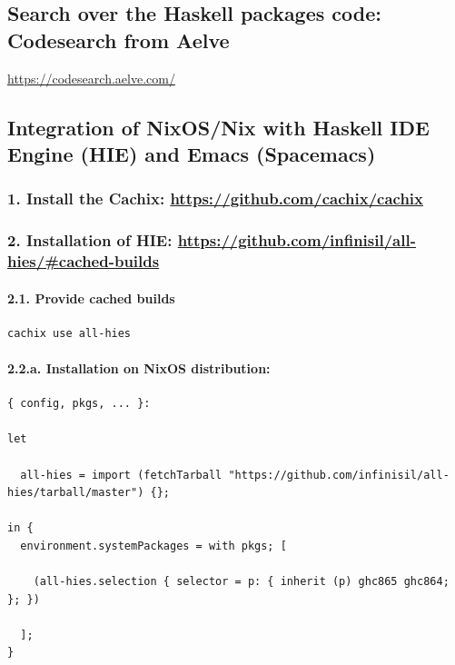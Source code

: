 \documentclass[11pt]{article}
\begin{document}
\subsection{Search over the Haskell packages code: Codesearch from Aelve}
\label{sec:org66c3194}
\url{https://codesearch.aelve.com/}\\

\subsection{Integration of NixOS/Nix with Haskell IDE Engine (HIE) and Emacs (Spacemacs)}
\label{sec:orgff3d598}
\subsubsection{1. Install the Cachix: \url{https://github.com/cachix/cachix}}
\label{sec:org0e44059}

\subsubsection{2. Installation of HIE: \url{https://github.com/infinisil/all-hies/\#cached-builds}}
\label{sec:org23c41cc}

\paragraph{2.1. Provide cached builds}
\label{sec:org0d01d0a}

\begin{verbatim}
cachix use all-hies
\end{verbatim}

\paragraph{2.2.a. Installation on NixOS distribution:}
\label{sec:org0ff16ac}

\begin{verbatim}
{ config, pkgs, ... }:

let

  all-hies = import (fetchTarball "https://github.com/infinisil/all-hies/tarball/master") {};

in {
  environment.systemPackages = with pkgs; [

    (all-hies.selection { selector = p: { inherit (p) ghc865 ghc864; }; })

  ];
}
\end{verbatim}
\end{document}
